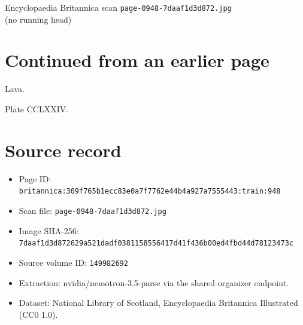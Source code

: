 \documentclass{article}
\begin{document}
\begin{center}
{\Large Encyclopaedia Britannica scan \texttt{page-0948-7daaf1d3d872.jpg}}\\[0.5em]
(no running head)
\end{center}
\section*{Continued from an earlier page}
Lava.

Plate CCLXXIV.

\section*{Source record}
\begin{itemize}
\item Page ID: \texttt{britannica:309f765b1ecc83e0a7f7762e44b4a927a7555443:train:948}
\item Scan file: \texttt{page-0948-7daaf1d3d872.jpg}
\item Image SHA-256: \texttt{7daaf1d3d872629a521dadf0381158556417d41f436b00ed4fbd44d78123473c}
\item Source volume ID: \texttt{149982692}
\item Extraction: nvidia/nemotron-3.5-parse via the shared organizer endpoint.
\item Dataset: National Library of Scotland, Encyclopaedia Britannica Illustrated (CC0 1.0).
\end{itemize}
\end{document}
